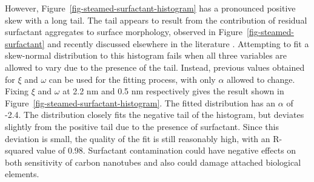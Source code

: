 \documentclass[
  a4paper,
]{scrbook}
\begin{document}
However, Figure~\ref{fig-steamed-surfactant-histogram} has a pronounced
positive skew with a long tail. The tail appears to result from the
contribution of residual surfactant aggregates to surface morphology,
observed in Figure~\ref{fig-steamed-surfactant} and recently discussed
elsewhere in the literature \autocite{Christensen2022,Vobornik2023}.
Attempting to fit a skew-normal distribution to this histogram fails
when all three variables are allowed to vary due to the presence of the
tail. Instead, previous values obtained for \(\xi\) and \(\omega\) can
be used for the fitting process, with only \(\alpha\) allowed to change.
Fixing \(\xi\) and \(\omega\) at 2.2 nm and 0.5 nm respectively gives
the result shown in Figure~\ref{fig-steamed-surfactant-histogram}. The
fitted distribution has an \(\alpha\) of -2.4. The distribution closely
fits the negative tail of the histogram, but deviates slightly from the
positive tail due to the presence of surfactant. Since this deviation is
small, the quality of the fit is still reasonably high, with an
R-squared value of 0.98. Surfactant contamination could have negative
effects on both sensitivity of carbon nanotubes and also could damage
attached biological elements.
\end{document}

